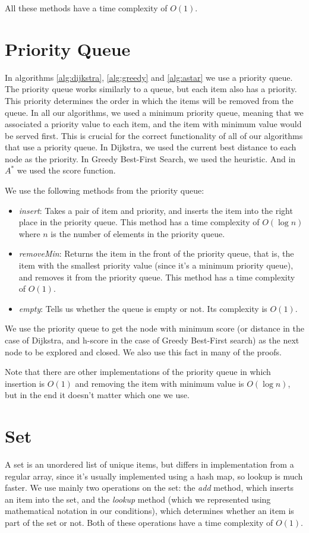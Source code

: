 \documentclass[12pt]{report}
\begin{document}
\begin{appendices}
All these methods have a time complexity of $O(1)$.

\section{Priority Queue}
\label{annex:priorityqueue}
In algorithms \ref{alg:dijkstra}, \ref{alg:greedy} and \ref{alg:astar} we use a priority queue. The priority queue works similarly to a queue, but each item also has a priority. This priority determines the order in which the items will be removed from the queue. In all our algorithms, we used a minimum priority queue, meaning that we associated a priority value to each item, and the item with minimum value would be served first. This is crucial for the correct functionality of all of our algorithms that use a priority queue. In Dijkstra, we used the current best distance to each node as the priority. In Greedy Best-First Search, we used the heuristic. And in $A^*$ we used the score function.

We use the following methods from the priority queue:
\begin{itemize}
\item \emph{insert}: Takes a pair of item and priority, and inserts the item into the right place in the priority queue. This method has a time complexity of $O(\log n)$ where $n$ is the number of elements in the priority queue.
\item \emph{removeMin}: Returns the item in the front of the priority queue, that is, the item with the smallest priority value (since it's a minimum priority queue), and removes it from the priority queue. This method has a time complexity of $O(1)$.
\item \emph{empty}: Tells us whether the queue is empty or not. Its complexity is $O(1)$.
\end{itemize}

We use the priority queue to get the node with minimum score (or distance in the case of Dijkstra, and h-score in the case of Greedy Best-First search) as the next node to be explored and closed. We also use this fact in many of the proofs.

Note that there are other implementations of the priority queue in which insertion is $O(1)$ and removing the item with minimum value is $O(\log n)$, but in the end it doesn't matter which one we use.

\section{Set}
A set is an unordered list of unique items, but differs in implementation from a regular array, since it's usually implemented using a hash map, so lookup is much faster. We use mainly two operations on the set: the \emph{add} method, which inserts an item into the set, and the \emph{lookup} method (which we represented using mathematical notation in our conditions), which determines whether an item is part of the set or not. Both of these operations have a time complexity of $O(1)$.


\end{appendices}
\end{document}
